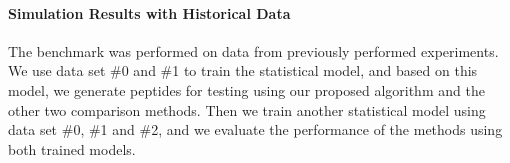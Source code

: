 \documentclass[12pt]{article}
\begin{document}
\paragraph{Simulation Results with Historical Data}
The benchmark was performed on data from previously performed experiments. We use data set \#0 and \#1 to train the statistical model, and based on this model, we generate peptides for testing using our proposed algorithm and the other two comparison methods. Then we train another statistical model using data set \#0, \#1 and \#2, and we evaluate the performance of the methods using both trained models.
\end{document}
